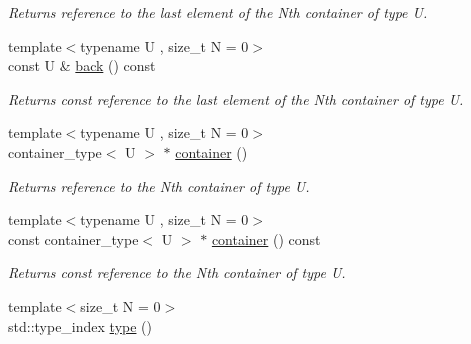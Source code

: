 \begin{DoxyCompactItemize}
\begin{DoxyCompactList}\small\item\em Returns reference to the last element of the Nth container of type U. \end{DoxyCompactList}\item 
\hypertarget{classheterogeneous_1_1heterodeque_3_01_t_00_01_types_8_8_8_4_af623e682c64756597a7bc044b7ee9405}{}{\footnotesize template$<$typename U , size\+\_\+t N = 0$>$ }\\const U \& \hyperlink{classheterogeneous_1_1heterodeque_3_01_t_00_01_types_8_8_8_4_af623e682c64756597a7bc044b7ee9405}{back} () const \label{classheterogeneous_1_1heterodeque_3_01_t_00_01_types_8_8_8_4_af623e682c64756597a7bc044b7ee9405}

\begin{DoxyCompactList}\small\item\em Returns const reference to the last element of the Nth container of type U. \end{DoxyCompactList}\item 
\hypertarget{classheterogeneous_1_1heterodeque_3_01_t_00_01_types_8_8_8_4_a09b9bb24d659c9dbf0a833f2d9f4909e}{}{\footnotesize template$<$typename U , size\+\_\+t N = 0$>$ }\\container\+\_\+type$<$ U $>$ $\ast$ \hyperlink{classheterogeneous_1_1heterodeque_3_01_t_00_01_types_8_8_8_4_a09b9bb24d659c9dbf0a833f2d9f4909e}{container} ()\label{classheterogeneous_1_1heterodeque_3_01_t_00_01_types_8_8_8_4_a09b9bb24d659c9dbf0a833f2d9f4909e}

\begin{DoxyCompactList}\small\item\em Returns reference to the Nth container of type U. \end{DoxyCompactList}\item 
\hypertarget{classheterogeneous_1_1heterodeque_3_01_t_00_01_types_8_8_8_4_afda534396ddd049f0eaf30e65d9c96e0}{}{\footnotesize template$<$typename U , size\+\_\+t N = 0$>$ }\\const container\+\_\+type$<$ U $>$ $\ast$ \hyperlink{classheterogeneous_1_1heterodeque_3_01_t_00_01_types_8_8_8_4_afda534396ddd049f0eaf30e65d9c96e0}{container} () const \label{classheterogeneous_1_1heterodeque_3_01_t_00_01_types_8_8_8_4_afda534396ddd049f0eaf30e65d9c96e0}

\begin{DoxyCompactList}\small\item\em Returns const reference to the Nth container of type U. \end{DoxyCompactList}\item 
\hypertarget{classheterogeneous_1_1heterodeque_3_01_t_00_01_types_8_8_8_4_a5f78bc3f70eb8ef49cc6de984ed4068f}{}{\footnotesize template$<$size\+\_\+t N = 0$>$ }\\std\+::type\+\_\+index \hyperlink{classheterogeneous_1_1heterodeque_3_01_t_00_01_types_8_8_8_4_a5f78bc3f70eb8ef49cc6de984ed4068f}{type} ()\label{classheterogeneous_1_1heterodeque_3_01_t_00_01_types_8_8_8_4_a5f78bc3f70eb8ef49cc6de984ed4068f}


\end{DoxyCompactItemize}
